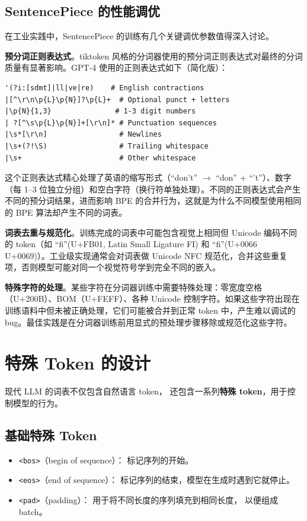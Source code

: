\subsection{SentencePiece 的性能调优}

在工业实践中，SentencePiece 的训练有几个关键调优参数值得深入讨论。

\textbf{预分词正则表达式}。tiktoken 风格的分词器使用的预分词正则表达式对最终的分词质量有显著影响。GPT-4 使用的正则表达式如下（简化版）：

\begin{lstlisting}[caption={GPT-4 pre-tokenization regex (simplified)}, language={}]
'(?i:[sdmt]|ll|ve|re)    # English contractions
|[^\r\n\p{L}\p{N}]?\p{L}+  # Optional punct + letters
|\p{N}{1,3}               # 1-3 digit numbers
| ?[^\s\p{L}\p{N}]+[\r\n]* # Punctuation sequences
|\s*[\r\n]                 # Newlines
|\s+(?!\S)                 # Trailing whitespace
|\s+                       # Other whitespace
\end{lstlisting}

这个正则表达式精心处理了英语的缩写形式（“don't” $\to$ “don” + “'t”）、数字（每 1--3 位独立分组）和空白字符（换行符单独处理）。不同的正则表达式会产生不同的预分词结果，进而影响 BPE 的合并行为，这就是为什么不同模型使用相同的 BPE 算法却产生不同的词表。

\textbf{词表去重与规范化}。训练完成的词表中可能包含视觉上相同但 Unicode 编码不同的 token（如 “ﬁ”(U+FB01, Latin Small Ligature FI) 和 “fi”(U+0066 U+0069)）。工业级实现通常会对词表做 Unicode NFC 规范化，合并这些重复项，否则模型可能对同一个视觉符号学到完全不同的嵌入。

\textbf{特殊字符的处理}。某些字符在分词器训练中需要特殊处理：零宽度空格（U+200B）、BOM（U+FEFF）、各种 Unicode 控制字符。如果这些字符出现在训练语料中但未被正确处理，它们可能被合并到正常 token 中，产生难以调试的 bug。最佳实践是在分词器训练前用显式的预处理步骤移除或规范化这些字符。

\section{特殊 Token 的设计}

现代 LLM 的词表不仅包含自然语言 token，
还包含一系列\textbf{特殊 token}，用于控制模型的行为。

\subsection{基础特殊 Token}

\begin{itemize}[noitemsep]
  \item \texttt{<bos>}（begin of sequence）：
        标记序列的开始。
  \item \texttt{<eos>}（end of sequence）：
        标记序列的结束，模型在生成时遇到它就停止。
  \item \texttt{<pad>}（padding）：
        用于将不同长度的序列填充到相同长度，
        以便组成 batch。
\end{itemize}

